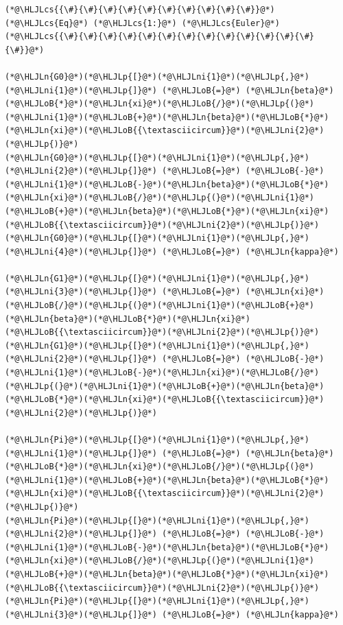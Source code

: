\documentclass[12pt,a4paper]{article}
\newcommand{\HLJLn}[1]{#1}
\newcommand{\HLJLni}[1]{\textcolor[RGB]{59,151,46}{#1}}
\newcommand{\HLJLoB}[1]{\textcolor[RGB]{102,102,102}{\textbf{#1}}}
\newcommand{\HLJLp}[1]{#1}
\newcommand{\HLJLcs}[1]{\textcolor[RGB]{153,153,119}{\textit{#1}}}
\begin{document}
\begin{lstlisting}
(*@\HLJLcs{{\#}{\#}{\#}{\#}{\#}{\#}{\#}{\#}{\#}{\#}}@*) (*@\HLJLcs{Eq}@*) (*@\HLJLcs{1:}@*) (*@\HLJLcs{Euler}@*) (*@\HLJLcs{{\#}{\#}{\#}{\#}{\#}{\#}{\#}{\#}{\#}{\#}{\#}{\#}{\#}{\#}}@*)

(*@\HLJLn{G0}@*)(*@\HLJLp{[}@*)(*@\HLJLni{1}@*)(*@\HLJLp{,}@*)(*@\HLJLni{1}@*)(*@\HLJLp{]}@*) (*@\HLJLoB{=}@*) (*@\HLJLn{beta}@*)(*@\HLJLoB{*}@*)(*@\HLJLn{xi}@*)(*@\HLJLoB{/}@*)(*@\HLJLp{(}@*)(*@\HLJLni{1}@*)(*@\HLJLoB{+}@*)(*@\HLJLn{beta}@*)(*@\HLJLoB{*}@*)(*@\HLJLn{xi}@*)(*@\HLJLoB{{\textasciicircum}}@*)(*@\HLJLni{2}@*)(*@\HLJLp{)}@*)
(*@\HLJLn{G0}@*)(*@\HLJLp{[}@*)(*@\HLJLni{1}@*)(*@\HLJLp{,}@*)(*@\HLJLni{2}@*)(*@\HLJLp{]}@*) (*@\HLJLoB{=}@*) (*@\HLJLoB{-}@*)(*@\HLJLni{1}@*)(*@\HLJLoB{-}@*)(*@\HLJLn{beta}@*)(*@\HLJLoB{*}@*)(*@\HLJLn{xi}@*)(*@\HLJLoB{/}@*)(*@\HLJLp{(}@*)(*@\HLJLni{1}@*)(*@\HLJLoB{+}@*)(*@\HLJLn{beta}@*)(*@\HLJLoB{*}@*)(*@\HLJLn{xi}@*)(*@\HLJLoB{{\textasciicircum}}@*)(*@\HLJLni{2}@*)(*@\HLJLp{)}@*)
(*@\HLJLn{G0}@*)(*@\HLJLp{[}@*)(*@\HLJLni{1}@*)(*@\HLJLp{,}@*)(*@\HLJLni{4}@*)(*@\HLJLp{]}@*) (*@\HLJLoB{=}@*) (*@\HLJLn{kappa}@*)

(*@\HLJLn{G1}@*)(*@\HLJLp{[}@*)(*@\HLJLni{1}@*)(*@\HLJLp{,}@*)(*@\HLJLni{3}@*)(*@\HLJLp{]}@*) (*@\HLJLoB{=}@*) (*@\HLJLn{xi}@*)(*@\HLJLoB{/}@*)(*@\HLJLp{(}@*)(*@\HLJLni{1}@*)(*@\HLJLoB{+}@*)(*@\HLJLn{beta}@*)(*@\HLJLoB{*}@*)(*@\HLJLn{xi}@*)(*@\HLJLoB{{\textasciicircum}}@*)(*@\HLJLni{2}@*)(*@\HLJLp{)}@*)
(*@\HLJLn{G1}@*)(*@\HLJLp{[}@*)(*@\HLJLni{1}@*)(*@\HLJLp{,}@*)(*@\HLJLni{2}@*)(*@\HLJLp{]}@*) (*@\HLJLoB{=}@*) (*@\HLJLoB{-}@*)(*@\HLJLni{1}@*)(*@\HLJLoB{-}@*)(*@\HLJLn{xi}@*)(*@\HLJLoB{/}@*)(*@\HLJLp{(}@*)(*@\HLJLni{1}@*)(*@\HLJLoB{+}@*)(*@\HLJLn{beta}@*)(*@\HLJLoB{*}@*)(*@\HLJLn{xi}@*)(*@\HLJLoB{{\textasciicircum}}@*)(*@\HLJLni{2}@*)(*@\HLJLp{)}@*)

(*@\HLJLn{Pi}@*)(*@\HLJLp{[}@*)(*@\HLJLni{1}@*)(*@\HLJLp{,}@*)(*@\HLJLni{1}@*)(*@\HLJLp{]}@*) (*@\HLJLoB{=}@*) (*@\HLJLn{beta}@*)(*@\HLJLoB{*}@*)(*@\HLJLn{xi}@*)(*@\HLJLoB{/}@*)(*@\HLJLp{(}@*)(*@\HLJLni{1}@*)(*@\HLJLoB{+}@*)(*@\HLJLn{beta}@*)(*@\HLJLoB{*}@*)(*@\HLJLn{xi}@*)(*@\HLJLoB{{\textasciicircum}}@*)(*@\HLJLni{2}@*)(*@\HLJLp{)}@*)
(*@\HLJLn{Pi}@*)(*@\HLJLp{[}@*)(*@\HLJLni{1}@*)(*@\HLJLp{,}@*)(*@\HLJLni{2}@*)(*@\HLJLp{]}@*) (*@\HLJLoB{=}@*) (*@\HLJLoB{-}@*)(*@\HLJLni{1}@*)(*@\HLJLoB{-}@*)(*@\HLJLn{beta}@*)(*@\HLJLoB{*}@*)(*@\HLJLn{xi}@*)(*@\HLJLoB{/}@*)(*@\HLJLp{(}@*)(*@\HLJLni{1}@*)(*@\HLJLoB{+}@*)(*@\HLJLn{beta}@*)(*@\HLJLoB{*}@*)(*@\HLJLn{xi}@*)(*@\HLJLoB{{\textasciicircum}}@*)(*@\HLJLni{2}@*)(*@\HLJLp{)}@*)
(*@\HLJLn{Pi}@*)(*@\HLJLp{[}@*)(*@\HLJLni{1}@*)(*@\HLJLp{,}@*)(*@\HLJLni{3}@*)(*@\HLJLp{]}@*) (*@\HLJLoB{=}@*) (*@\HLJLn{kappa}@*)


\end{lstlisting}
\end{document}
